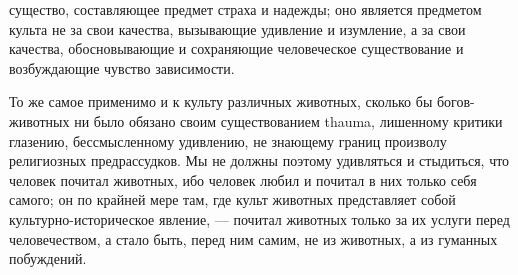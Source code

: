 \documentclass[12pt]{article}
\begin{document}
существо, составляющее предмет страха и надежды; оно является предметом культа не за свои качества, вызывающие удивление и изумление, а за свои качества, обосновывающие и сохраняющие человеческое существование и возбуждающие чувство зависимости. 

То же самое применимо и к культу различных животных, сколько бы богов-животных ни было обязано своим существованием thauma, лишенному критики глазению, бессмысленному удивлению, не знающему границ произволу религиозных предрассудков. Мы не должны поэтому удивляться и стыдиться, что человек почитал животных, ибо человек любил и почитал в них только себя самого; он по крайней мере там, где культ животных представляет собой культурно-историческое явление, --- почитал животных только за их услуги перед человечеством, а стало быть, перед ним самим, не из животных, а из гуманных побуждений. 
\end{document}
